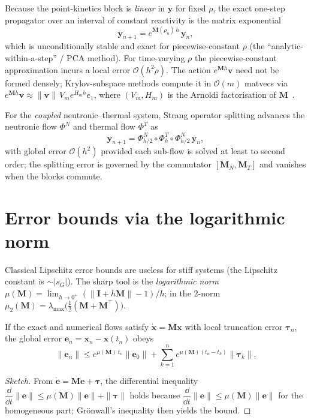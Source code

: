 Because the point-kinetics block is \emph{linear} in $\mathbf y$ for fixed $\rho$,
the exact one-step propagator over an interval of constant reactivity is the matrix
exponential
\begin{equation}
\mathbf y_{n+1}=e^{\mathbf M(\rho_n)\,h}\,\mathbf y_n,
\label{eq:expprop}
\end{equation}
which is unconditionally stable and exact for piecewise-constant $\rho$ (the
``analytic-within-a-step'' / PCA method). For time-varying $\rho$ the
piecewise-constant approximation incurs a local error $\mathcal O(h^2\dot\rho)$.
The action $e^{\mathbf M h}\mathbf v$ need not be formed densely; Krylov-subspace
methods compute it in $\mathcal O(m)$ matvecs via
$e^{\mathbf M h}\mathbf v\approx\|\mathbf v\|\,V_m e^{H_m h}e_1$, where $(V_m,H_m)$
is the Arnoldi factorisation of $\mathbf M$~\cite{molervanloan}.

For the \emph{coupled} neutronic--thermal system, Strang operator splitting advances
the neutronic flow $\Phi^N$ and thermal flow $\Phi^T$ as
\begin{equation}
\mathbf y_{n+1}=\Phi^N_{h/2}\circ\Phi^T_{h}\circ\Phi^N_{h/2}\,\mathbf y_n,
\end{equation}
with global error $\mathcal O(h^2)$ provided each sub-flow is solved at least to
second order; the splitting error is governed by the commutator $[\mathbf
M_N,\mathbf M_T]$ and vanishes when the blocks commute.

\section{Error bounds via the logarithmic norm}
\label{sec:lognorm}

Classical Lipschitz error bounds are useless for stiff systems (the Lipschitz
constant is $\sim|s_G|$). The sharp tool is the \emph{logarithmic norm}
$\mu(\mathbf M)=\lim_{h\to0^+}(\|\mathbf I+h\mathbf M\|-1)/h$; in the $2$-norm
$\mu_2(\mathbf M)=\lambda_{\max}\!\big(\tfrac12(\mathbf M+\mathbf M^{\!\top})\big)$.

\begin{theorem}
\label{thm:lognorm}
If the exact and numerical flows satisfy $\dot{\mathbf x}=\mathbf M\mathbf x$ with
local truncation error $\boldsymbol\tau_n$, the global error
$\mathbf e_n=\mathbf x_n-\mathbf x(t_n)$ obeys
\begin{equation}
\|\mathbf e_n\|\le e^{\mu(\mathbf M)\,t_n}\|\mathbf e_0\|
+\sum_{k=1}^{n}e^{\mu(\mathbf M)(t_n-t_k)}\|\boldsymbol\tau_k\|.
\end{equation}
\end{theorem}
\begin{proof}[Sketch]
From $\dot{\mathbf e}=\mathbf M\mathbf e+\boldsymbol\tau$, the differential
inequality $\dfrac{\dd}{\dd t}\|\mathbf e\|\le\mu(\mathbf M)\|\mathbf
e\|+\|\boldsymbol\tau\|$ holds because
$\dfrac{\dd}{\dd t}\|\mathbf e\|\le\mu(\mathbf M)\|\mathbf e\|$ for the homogeneous
part; Gr\"onwall's inequality then yields the bound.
\end{proof}

